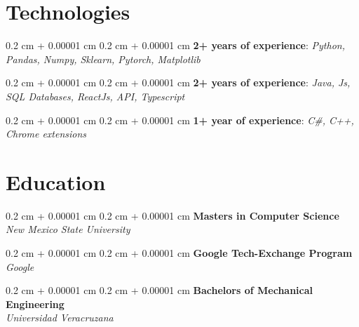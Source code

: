 \documentclass[10pt,letterpaper]{article}%
\newenvironment{onecolentry}{
    \begin{adjustwidth}{
        0.2 cm + 0.00001 cm
    }{
        0.2 cm + 0.00001 cm
    }
}{
    \end{adjustwidth}
} %
\begin{document}
\section{Technologies} %
\label{section:Technologies}%
    \begin{onecolentry} %
        \textbf{2+ years of experience}: \textit{Python, Pandas, Numpy, Sklearn, Pytorch, Matplotlib} %
    \end{onecolentry} %
    \vspace{0.10 cm}%
    \begin{onecolentry} %
        \textbf{2+ years of experience}: \textit{Java, Js, SQL Databases, ReactJs, API, Typescript} %
    \end{onecolentry} %
    \vspace{0.10 cm}%
    \begin{onecolentry} %
        \textbf{1+ year of experience}: \textit{C\#, C++, Chrome extensions} %
    \end{onecolentry} %
    \vspace{0.10 cm}%
\section{Education} %
\label{section:Education}%
    \begin{onecolentry} %
        \textbf{Masters in Computer Science}  \\ %
        \textit{New Mexico State University} %
    \end{onecolentry} %
    \vspace{0.10 cm}%
    \begin{onecolentry} %
        \textbf{Google Tech-Exchange Program}  \\ %
        \textit{Google} %
    \end{onecolentry} %
    \vspace{0.10 cm}%
    \begin{onecolentry} %
        \textbf{Bachelors of Mechanical Engineering}  \\ %
        \textit{Universidad Veracruzana} %
    \end{onecolentry} %
    \vspace{0.10 cm}%
\end{document}
